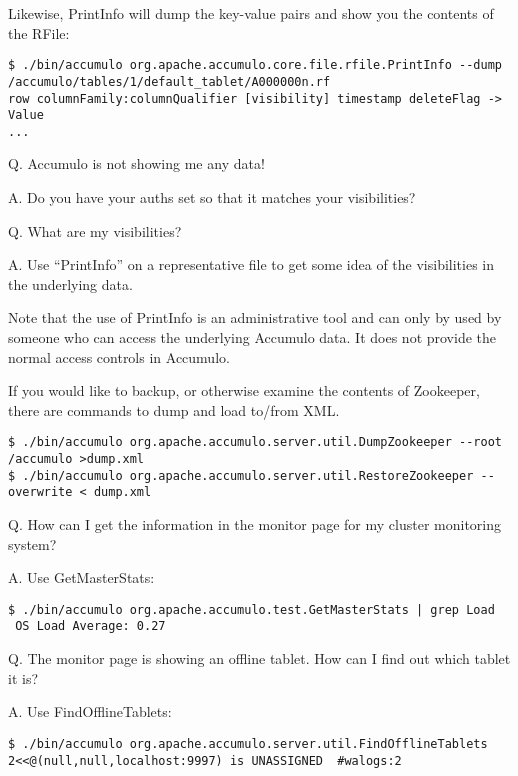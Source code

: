 Likewise, PrintInfo will dump the key-value pairs and show you the contents of the RFile:

\small
\begin{verbatim}
$ ./bin/accumulo org.apache.accumulo.core.file.rfile.PrintInfo --dump /accumulo/tables/1/default_tablet/A000000n.rf
row columnFamily:columnQualifier [visibility] timestamp deleteFlag -> Value
...
\end{verbatim}
\normalsize

Q. Accumulo is not showing me any data!

A. Do you have your auths set so that it matches your visibilities?

Q. What are my visibilities?

A. Use ``PrintInfo'' on a representative file to get some idea of the visibilities in the underlying data.

Note that the use of PrintInfo is an administrative tool and can only
by used by someone who can access the underlying Accumulo data. It
does not provide the normal access controls in Accumulo.

If you would like to backup, or otherwise examine the contents of Zookeeper, there are commands to dump and load to/from XML.

\small
\begin{verbatim}
$ ./bin/accumulo org.apache.accumulo.server.util.DumpZookeeper --root /accumulo >dump.xml
$ ./bin/accumulo org.apache.accumulo.server.util.RestoreZookeeper --overwrite < dump.xml
\end{verbatim}
\normalsize

Q. How can I get the information in the monitor page for my cluster monitoring system?

A. Use GetMasterStats:

\small
\begin{verbatim}
$ ./bin/accumulo org.apache.accumulo.test.GetMasterStats | grep Load
 OS Load Average: 0.27
\end{verbatim}
\normalsize

Q. The monitor page is showing an offline tablet.  How can I find out which tablet it is?

A. Use FindOfflineTablets:

\small
\begin{verbatim}
$ ./bin/accumulo org.apache.accumulo.server.util.FindOfflineTablets
2<<@(null,null,localhost:9997) is UNASSIGNED  #walogs:2
\end{verbatim}
\normalsize

